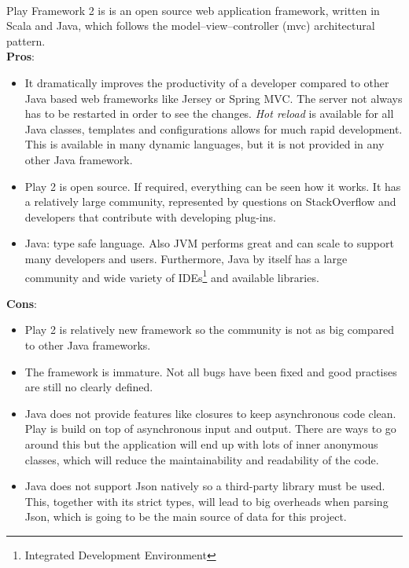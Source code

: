 \documentclass{l4proj}
\begin{document}
\paragraph{}
Play Framework 2 is is an open source web application framework, written in Scala and Java, which follows the model–view–controller (mvc) architectural pattern. 
\\ \textbf{Pros}:
\begin{itemize}

\item It dramatically improves the productivity of a developer compared to other Java based web frameworks like Jersey or Spring MVC. The server not always has to be restarted in order to see the changes. \textit{Hot reload} is available for all Java classes, templates and configurations allows for much rapid development. This is available in many dynamic languages, but it is not provided in any other Java framework.

\item Play 2 is open source. If required, everything can be seen how it works. It has a relatively large community, represented by questions on StackOverflow and developers that contribute with developing plug-ins.

\item Java: type safe language. Also JVM performs great and can scale to support many developers and users. Furthermore, Java by itself has a large community and 
wide variety of IDEs\footnote{Integrated Development Environment} and available libraries.
	
\end{itemize}
\textbf{Cons}:
\begin{itemize}
\item Play 2 is relatively new framework so the community is not as big compared to other Java frameworks. 

\item The framework is immature. Not all bugs have been fixed and good practises are still no clearly defined. 

\item Java does not provide features like closures to keep asynchronous code clean. Play is build on top of asynchronous input and output. There are ways to go around this but the application will end up with lots of inner anonymous classes, which will reduce the maintainability and readability of the code.

\item Java does not support Json natively so a third-party library must be used. This, together with its strict types, will lead to big overheads when parsing Json, which 
is going to be the main source of data for this project.  
\end{itemize}
\end{document}

